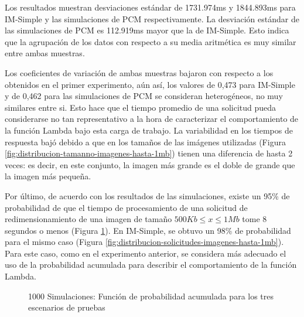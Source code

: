 Los resultados muestran desviaciones estándar de 1731.974ms y 1844.893ms para IM-Simple y las simulaciones de PCM respectivamente. La desviación estándar de las simulaciones de PCM es 112.919ms mayor que la de IM-Simple. Esto indica que la agrupación de los datos con respecto a su media aritmética es muy similar entre ambas muestras.

Los coeficientes de variación de ambas muestras bajaron con respecto a los obtenidos en el primer experimento, aún así, los valores de 0,473 para IM-Simple y de 0,462 para las simulaciones de PCM se consideran heterogéneos, no muy similares entre si. Esto hace que el tiempo promedio de una solicitud pueda considerarse no tan representativo a la hora de caracterizar el comportamiento de la función Lambda bajo esta carga de trabajo. La variabilidad en los tiempos de respuesta bajó debido a que en los tamaños de las imágenes utilizadas (Figura \ref{fig:distribucion-tamanno-imagenes-hasta-1mb}) tienen una diferencia de hasta 2 veces: es decir, en este conjunto, la imagen más grande es el doble de grande que la imagen más pequeña.

Por último, de acuerdo con los resultados de las simulaciones, existe un 95\% de probabilidad de que el tiempo de procesamiento de una solicitud de redimensionamiento de una imagen de tamaño $500Kb \leq x \leq 1Mb$ tome 8 segundos o menos (Figura \ref{fig:funcion-acumulada-palladio-1mb}). En IM-Simple, se obtuvo un 98\% de probabilidad para el mismo caso (Figura \ref{fig:distribucion-solicitudes-imagenes-hasta-1mb}). Para este caso, como en el experimento anterior, se considera más adecuado el uso de la probabilidad acumulada para describir el comportamiento de la función Lambda.

\hspace{-3cm}
\begin{figure}[h]
\caption{1000 Simulaciones: Función de probabilidad acumulada para los tres escenarios de pruebas}
\label{fig:funcion-acumulada-palladio-1mb}
\end{figure}


